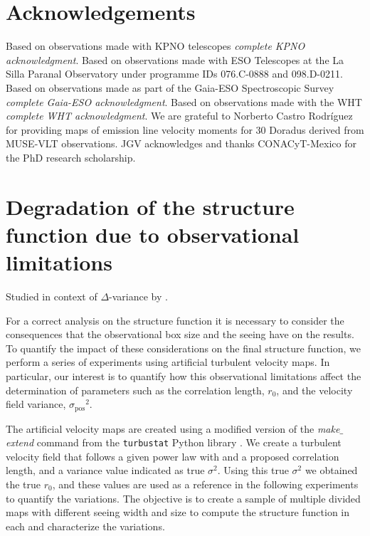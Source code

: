 \documentclass[fleqn,usenatbib, useAMS, a4paper]{mnras}
\newcommand\pos{\ensuremath{_{\mathrm{pos}}}}
\begin{document}

\section*{Acknowledgements}

Based on observations made with KPNO telescopes
\textit{complete KPNO acknowledgment}.
Based on observations made with ESO Telescopes at the La Silla Paranal Observatory under programme IDs 076.C-0888 and 098.D-0211.
Based on observations made as part of the Gaia-ESO Spectroscopic Survey
\textit{complete Gaia-ESO acknowledgment}.
Based on observations made with the WHT
\textit{complete WHT acknowledgment}.
We are grateful to Norberto Castro Rodríguez for providing maps of emission line velocity moments for 30 Doradus derived from MUSE-VLT observations.
JGV acknowledges and thanks CONACyT-Mexico for the PhD research scholarship.







\appendix

\section{Degradation of the structure function due to observational limitations}
\label{sec:degr-struct-funct}
Studied in context of \(\Delta\)-variance by \citet{Bensch:2001l}.

For a correct analysis on the structure function it is necessary to consider the consequences that the observational box size and the seeing have on the results.
To quantify the impact of these considerations on the final structure function, we perform a series of experiments using artificial turbulent velocity maps.
In particular, our interest is to quantify how this observational limitations affect the determination of parameters such as the correlation length, \(r_0\), and the velocity field variance, \(\sigma\pos^2 \). 

The artificial velocity maps are created using a modified version of the \textit{make$\_$extend} command from the \texttt{turbustat} Python library \citep{Koch2019AJ....158....1K}.
We create a turbulent velocity field that follows a given power law with and a proposed correlation length, and a variance value indicated as true \(\sigma^2\).
Using this true \(\sigma^2\) we obtained the true \(r_0\), and these values are used as a reference in the following experiments to quantify the variations.
The objective is to create a sample of multiple divided maps with different seeing width and size to compute the structure function in each and characterize the variations. 
\end{document}
